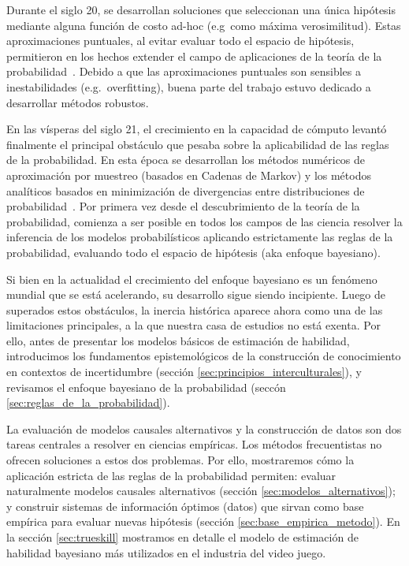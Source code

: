 \documentclass[a4paper,11pt]{book}
\theoremstyle{definition}
\begin{document}

Durante el siglo 20, se desarrollan soluciones que seleccionan una única hipótesis mediante alguna función de costo ad-hoc (e.g~como máxima verosimilitud).
%
Estas aproximaciones puntuales, al evitar evaluar todo el espacio de hipótesis, permitieron en los hechos extender el campo de aplicaciones de la teoría de la probabilidad~\cite{friedman2001-elementsOfStatisticalLearning}.
%
Debido a que las aproximaciones puntuales son sensibles a inestabilidades (e.g.~overfitting), buena parte del trabajo estuvo dedicado a desarrollar métodos robustos.


En las vísperas del siglo 21, el crecimiento en la capacidad de cómputo levantó finalmente el principal obstáculo que pesaba sobre la aplicabilidad de las reglas de la probabilidad.
%
En esta época se desarrollan los métodos numéricos de aproximación por muestreo (basados en Cadenas de Markov) y los métodos analíticos basados en minimización de divergencias entre distribuciones de probabilidad~\cite{bishop2006-PRML,martin2020-computingBayes}.
%
Por primera vez desde el descubrimiento de la teoría de la probabilidad, comienza a ser posible en todos los campos de las ciencia resolver la inferencia de los modelos probabilísticos aplicando estrictamente las reglas de la probabilidad, evaluando todo el espacio de hipótesis (aka enfoque bayesiano).


Si bien en la actualidad el crecimiento del enfoque bayesiano es un fenómeno mundial que se está acelerando, su desarrollo sigue siendo incipiente.
%
Luego de superados estos obstáculos, la inercia histórica aparece ahora como una de las limitaciones principales, a la que nuestra casa de estudios no está exenta.
%
Por ello, antes de presentar los modelos básicos de estimación de habilidad, introducimos los fundamentos epistemológicos de la construcción de conocimiento en contextos de incertidumbre (secci\'on \ref{sec:principios_interculturales}), y revisamos el enfoque bayesiano de la probabilidad (seccón \ref{sec:reglas_de_la_probabilidad}).


La evaluación de modelos causales alternativos y la construcción de datos son dos tareas centrales a resolver en ciencias emp\'iricas.
%
Los métodos frecuentistas no ofrecen soluciones a estos dos problemas.
%
Por ello, mostraremos cómo la aplicación estricta de las reglas de la probabilidad permiten: evaluar naturalmente modelos causales alternativos (secci\'on \ref{sec:modelos_alternativos}); y construir sistemas de información óptimos (datos) que sirvan como base emp\'irica para evaluar nuevas hip\'otesis (secci\'on \ref{sec:base_empirica_metodo}).
En la sección \ref{sec:trueskill} mostramos en detalle el modelo de estimación de habilidad bayesiano más utilizados en el industria del video juego.
%
\end{document}
